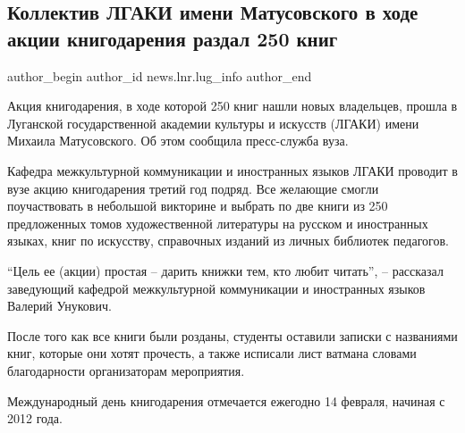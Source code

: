  
 
 
 
 
 
\subsection{Коллектив ЛГАКИ имени Матусовского в ходе акции книгодарения раздал 250 книг}
\label{sec:14_02_2022.stz.news.lnr.lug_info.1.lgaki_knigi}
 
\ifcmt
 author_begin
   author_id news.lnr.lug_info
 author_end
\fi

Акция книгодарения, в ходе которой 250 книг нашли новых владельцев, прошла в
Луганской государственной академии культуры и искусств (ЛГАКИ) имени Михаила
Матусовского. Об этом сообщила пресс-служба вуза.


Кафедра межкультурной коммуникации и иностранных языков ЛГАКИ проводит в вузе
акцию книгодарения третий год подряд. Все желающие смогли поучаствовать в
небольшой викторине и выбрать по две книги из 250 предложенных томов
художественной литературы на русском и иностранных языках, книг по искусству,
справочных изданий из личных библиотек педагогов.


\enquote{Цель ее (акции) простая – дарить книжки тем, кто любит читать}, –
рассказал заведующий кафедрой межкультурной коммуникации и иностранных языков
Валерий Унукович.

После того как все книги были розданы, студенты оставили записки с названиями
книг, которые они хотят прочесть, а также исписали лист ватмана словами
благодарности организаторам мероприятия.

Международный день книгодарения отмечается ежегодно 14 февраля, начиная с 2012
года.
